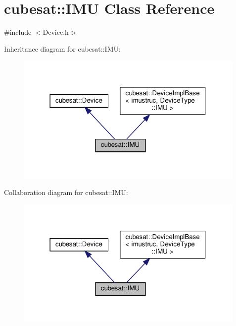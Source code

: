 \hypertarget{classcubesat_1_1IMU}{}\section{cubesat\+:\+:I\+MU Class Reference}
\label{classcubesat_1_1IMU}


{\ttfamily \#include $<$Device.\+h$>$}



Inheritance diagram for cubesat\+:\+:I\+MU\+:
\nopagebreak
\begin{figure}[H]
\begin{center}
\leavevmode
\includegraphics[width=316pt]{classcubesat_1_1IMU__inherit__graph}
\end{center}
\end{figure}


Collaboration diagram for cubesat\+:\+:I\+MU\+:
\nopagebreak
\begin{figure}[H]
\begin{center}
\leavevmode
\includegraphics[width=316pt]{classcubesat_1_1IMU__coll__graph}
\end{center}
\end{figure}
